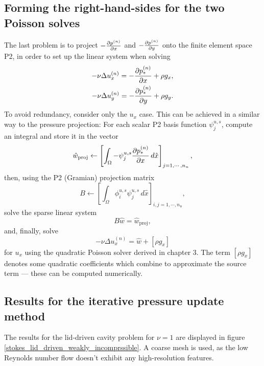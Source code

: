 \subsection{Forming the right-hand-sides for the two Poisson solves}
The last problem is to project $-\frac{\partial p^{(n)}}{\partial x}$ and $-\frac{\partial p^{(n)}}{\partial y}$ onto the finite element space P2,
in order to set up the linear system when solving
\begin{align*}
    -\nu\Delta u_x^{(n)} = -\frac{\partial p_*^{(n)}}{\partial x} + \rho g_x,\\
    -\nu\Delta u_y^{(n)} = -\frac{\partial p_*^{(n)}}{\partial y} + \rho g_y.
\end{align*}
To avoid redundancy, consider only the $u_x$ case.
This can be achieved in a similar way to the pressure projection: For each scalar P2 basis function $\psi^{u,s}_j$, compute an integral
and store it in the vector
$$
    \hat{w}_{\text{proj}} \leftarrow \left[\int_\Omega -\psi^{u,s}_j \frac{\partial p_*^{(n)}}{\partial x}\,d\hat{x}\right]_{j=1,\cdots,n_u},
$$
then, using the P2 (Gramian) projection matrix
$$
    B \leftarrow \left[ \int_\Omega \phi^{u,s}_i\psi^{u,s}_j \,d\hat{x}\right]_{i,j=1,\cdots,n_u},
$$
solve the sparse linear system
$$
    B\hat{w} = \hat{w}_{\text{proj}},
$$
and, finally, solve
$$
    -\nu\Delta u_x^{(n)} = \hat{w} + \left[\rho g_x\right]
$$
for $u_x$ using the quadratic Poisson solver derived in chapter 3. The term $\left[\rho g_x\right]$ denotes some quadratic coefficients
which combine to approximate the source term --- these can be computed numerically.

\subsection{Results for the iterative pressure update method}
The results for the lid-driven cavity problem for $\nu = 1$ are displayed in figure \ref{stokes_lid_driven_weakly_incomprssible}.
A coarse mesh is used, as the low Reynolds number flow doesn't exhibit any high-resolution features.

